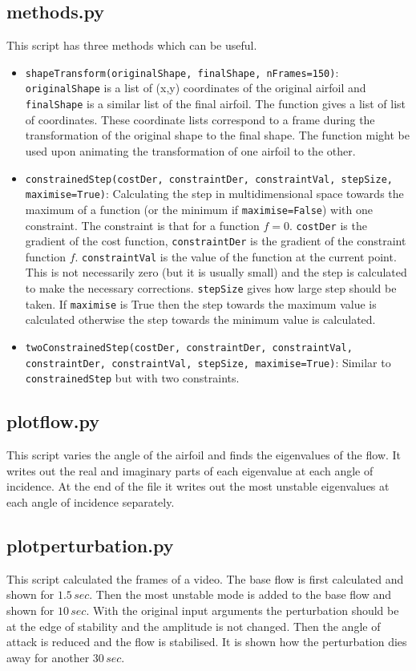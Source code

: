 \documentclass[12pt, a4paper]{article}
\begin{document}
        \subsection{methods.py}
            This script has three methods which can be useful.
            \begin{itemize}
                \item \texttt{shapeTransform(originalShape, finalShape, nFrames=150)}: \texttt{originalShape} is a list of (x,y) coordinates of the original airfoil and \texttt{finalShape} is a similar list of the final airfoil. The function gives a list of list of coordinates. These coordinate lists correspond to a frame during the transformation of the original shape to the final shape. The function might be used upon animating the transformation of one airfoil to the other.
                \item \texttt{constrainedStep(costDer, constraintDer, constraintVal, stepSize, maximise=True)}: Calculating the step in multidimensional space towards the maximum of a function (or the minimum if \texttt{maximise=False}) with one constraint. The constraint is that for a function $f = 0$. \texttt{costDer} is the gradient of the cost function, \texttt{constraintDer} is the gradient of the constraint function $f$. \texttt{constraintVal} is the value of the function at the current point. This is not necessarily zero (but it is usually small) and the step is calculated to make the necessary corrections. \texttt{stepSize} gives how large step should be taken. If \texttt{maximise} is True then the step towards the maximum value is calculated otherwise the step towards the minimum value is calculated.
                \item \texttt{twoConstrainedStep(costDer, constraintDer, constraintVal, constraintDer, constraintVal, stepSize, maximise=True)}: Similar to \texttt{constrainedStep} but with two constraints.
            \end{itemize}
        \subsection{plot\textunderscore flow.py}
            This script varies the angle of the airfoil and finds the eigenvalues of the flow. It writes out the real and imaginary parts of each eigenvalue at each angle of incidence. At the end of the file it writes out the most unstable eigenvalues at each angle of incidence separately.
        \subsection{plot\textunderscore perturbation.py}
            This script calculated the frames of a video. The base flow is first calculated and shown for $1.5 \, sec$. Then the most unstable mode is added to the base flow and shown for $10 \, sec$. With the original input arguments the perturbation should be at the edge of stability and the amplitude is not changed. Then the angle of attack is reduced and the flow is stabilised. It is shown how the perturbation dies away for another $30 \, sec$.
\end{document}
